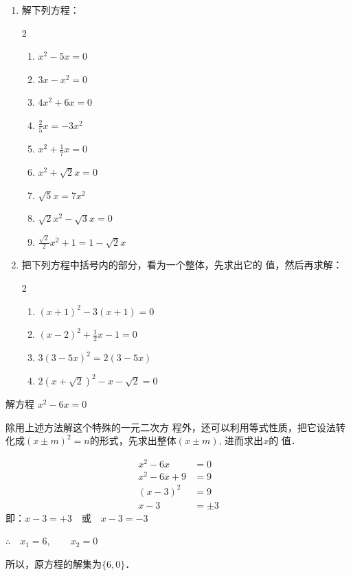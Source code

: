 \begin{ex}
\begin{enumerate}
    \item 解下列方程：
\begin{multicols}{2}
    \begin{enumerate}
    \item $x^{2}-5 x=0$
    \item $3 x-x^{2}=0$
    \item $4 x^{2}+6 x=0$
    \item $\frac{2}{5} x=-3 x^{2}$
    \item $x^{2}+\frac{1}{7} x=0$
    \item $x^{2}+\sqrt{2} x=0$
    \item $\sqrt{5} x=7 x^{2}$
    \item  $\sqrt{2} x^{2}-\sqrt{3} x=0$
    \item $\frac{\sqrt{2}}{2} x^{2}+1=1-\sqrt{2} x$
\end{enumerate}
\end{multicols}
\item 把下列方程中括号内的部分，看为一个整体，先求出它的
值，然后再求解：
\begin{multicols}{2}
\begin{enumerate}
    \item $(x+1)^{2}-3(x+1)=0$
    \item $(x-2)^{2}+\frac{1}{2} x-1=0$
    \item $3(3-5 x)^{2}=2(3-5 x)$
    \item $2(x+\sqrt{2})^{2}-x-\sqrt{2}=0$
\end{enumerate}
\end{multicols}
\end{enumerate}
\end{ex}

\begin{example}
解方程 $x^2-6x=0$
\end{example}

\begin{analyze}
    除用上述方法解这个特殊的一元二次方
程外，还可以利用等式性质，把它设法转化成$(x\pm 
m)^2=n$的形式，先求出整体$(x\pm m)$, 进而求出$x$的
值．
\end{analyze}

\begin{solution}
\begin{align*}
    x^2-6x&=0\\
    x^2-6x+9&=9 \tag{两边加上9}\\
    (x-3)^2&=9\\
    x-3&=\pm 3  \tag{平方根的意义}
\end{align*}    
即：$x-3=+3\quad \text{或}\quad x-3=-3$

$\therefore\quad x_1=6,\qquad x_2=0$

所以，原方程的解集为$\{6,0\}$．
\end{solution}

